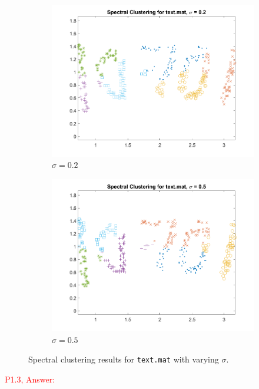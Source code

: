 \documentclass[11pt]{article}
\begin{document}
\begin{figure}[!ht]
\begin{subfigure}{0.45\textwidth}
        \includegraphics[width=\linewidth]{text_sigma_0.200.png}
        \caption{\(\sigma = 0.2\)}
    \end{subfigure}
    \begin{subfigure}{0.45\textwidth}
        \includegraphics[width=\linewidth]{text_sigma_0.500.png}
        \caption{\(\sigma = 0.5\)}
    \end{subfigure}
    \caption{Spectral clustering results for \texttt{text.mat} with varying \(\sigma\).}
    \label{fig:text}
\end{figure}

\clearpage
\textcolor{red}{P1.3, Answer:}\\
\end{document}
